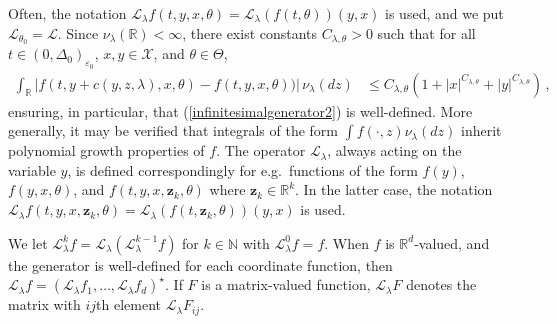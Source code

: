 \documentclass[11pt,a4paper]{article}
\newcommand{\thetan}{{\theta_0}}
\newcommand{\RR}{{\mathbb R}}
\newcommand{\NN}{{\mathbb N}}
\renewcommand{\ll}{{\mathcal{L}}}
\newcommand{\xx}{{\mathcal{X}}}
\numberwithin{equation}{section}
\numberwithin{theorem}{section}
\begin{document}
Often, the notation $\ll_\lambda f(t,y,x,\theta)=\ll_\lambda(f(t,\theta))(y,x)$ is used, and we put $\ll_\thetan = \ll$. Since $\nu_\lambda(\RR)<\infty$, there exist constants $C_{\lambda,\theta} > 0$ such that for all $t \in (0,\Delta_0)_{\varepsilon_0}$, $x,y \in \xx$, and $\theta \in \Theta$, 
\begin{align*}
  \int_\RR |f(t,y + c(y,z, \lambda),x, \theta) - f(t,y,x, \theta))|\, \nu_\lambda(dz)
  &\leq C_{\lambda,\theta}\left(1+|x|^{C_{\lambda,\theta}}+ |y|^{C_{\lambda,\theta}}\right)\,,
\end{align*}
ensuring, in particular, that (\ref{infinitesimalgenerator2}) is well-defined. More generally, it may be verified that integrals of the form $\int f(\cdot,z)\nu_\lambda(dz)$ inherit polynomial growth properties of $f$. The operator $\ll_\lambda$, always acting on the variable $y$, is defined correspondingly for e.g.\ functions of the form $f(y)$, $f(y,x,\theta)$, and $f(t,y,x,\mathbf{z}_k, \theta)$ where $\mathbf{z}_k\in \RR^k$.
In the latter case, the notation $\ll_\lambda f(t,y,x,\mathbf{z}_k, \theta)  = \ll_\lambda(f(t,\mathbf{z}_k, \theta) )(y,x)$ is used. \medskip

We let $\ll_\lambda^k f = \ll_\lambda(\ll_\lambda^{k-1} f)$ for $k\in \NN$ with $\ll_\lambda^0 f = f$. When $f$ is $\RR^d$-valued, and the generator is well-defined for each coordinate function, then $\ll_\lambda f = (\ll_\lambda f_1,\ldots, \ll_\lambda f_d)^\star $. If $F$ is a matrix-valued function, $\ll_\lambda F$ denotes the matrix with $ij$th element $\ll_\lambda F_{ij}$. \medskip
\end{document}
